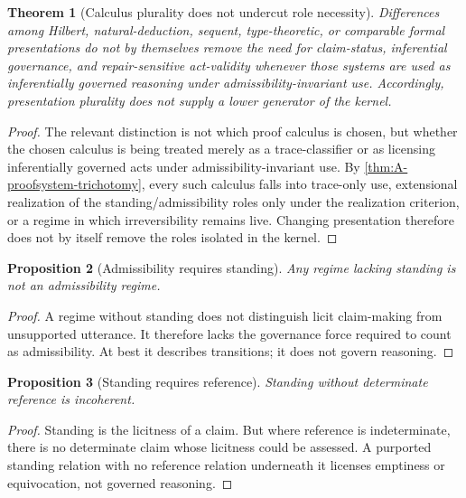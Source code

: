 \documentclass[11pt]{article}
\theoremstyle{plain}
\newtheorem{theorem}{Theorem}[section]
\newtheorem{proposition}[theorem]{Proposition}
\theoremstyle{definition}
\begin{document}
\begin{theorem}[Calculus plurality does not undercut role necessity]
\label{thm:A-calculus-plurality}
Differences among Hilbert, natural-deduction, sequent, type-theoretic, or comparable formal
presentations do not by themselves remove the need for claim-status, inferential governance, and
repair-sensitive act-validity whenever those systems are used as inferentially governed reasoning under admissibility-invariant use.
Accordingly, presentation plurality does not supply a lower generator of the kernel.
\end{theorem}

\begin{proof}
The relevant distinction is not which proof calculus is chosen, but whether the chosen calculus is
being treated merely as a trace-classifier or as licensing inferentially governed acts under admissibility-invariant use. By
\cref{thm:A-proofsystem-trichotomy}, every such calculus falls into trace-only use, extensional
realization of the standing/admissibility roles only under the realization criterion, or a regime in which irreversibility remains live.
Changing presentation therefore does not by itself remove the roles isolated in the kernel.
\end{proof}

\begin{proposition}[Admissibility requires standing]
\label{prop:A-adm-requires-stand}
Any regime lacking standing is not an admissibility regime.
\end{proposition}

\begin{proof}
A regime without standing does not distinguish licit claim-making from unsupported utterance. It therefore lacks the governance force required to count as admissibility. At best it describes transitions; it does not govern reasoning.
\end{proof}

\begin{proposition}[Standing requires reference]
\label{prop:A-stand-requires-ref}
Standing without determinate reference is incoherent.
\end{proposition}

\begin{proof}
Standing is the licitness of a claim. But where reference is indeterminate, there is no determinate claim whose licitness could be assessed. A purported standing relation with no reference relation underneath it licenses emptiness or equivocation, not governed reasoning.
\end{proof}
\end{document}
